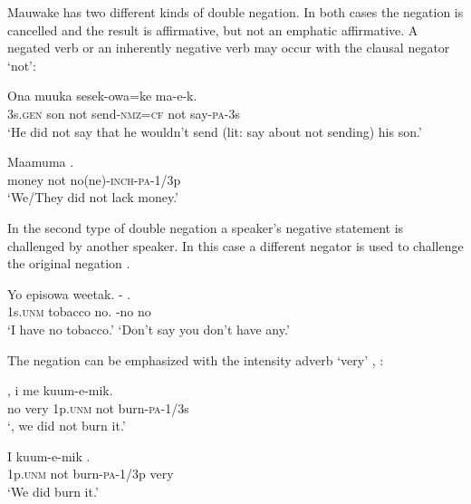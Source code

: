 Mauwake has two different kinds of double negation. In both cases the negation is cancelled and the result is affirmative, but not an emphatic affirmative. A negated verb  or an inherently negative verb  may occur with the clausal negator  `not':

\ea%
\label{ex:6:x1131}
\gll Ona  muuka    sesek-owa=ke    ma-e-k. \\
3s.\textsc{gen}  son  not  send-\textsc{nmz}=\textsc{cf}  not  say-\textsc{pa}-3s\\
\glt `He did not say that he wouldn't send (lit: say about not sending) his son.'
\z

\ea%
\label{ex:6:x1132}
\gll Maamuma    . \\
money  not  no(ne)-\textsc{inch}-\textsc{pa}-1/3p\\
\glt `We/They did not lack money.'
\z

In the second type of double negation a speaker's negative statement is challenged by another speaker. In this case a different negator is used to challenge the original negation . 

\ea%
\label{ex:6:x1133}
\gll Yo  episowa  weetak.  -  . \\
1s.\textsc{unm}  tobacco  no.  -no  no\\
\glt `I have no tobacco.'  `Don't say you don't have any.'
\z

The negation can be emphasized with the intensity adverb  `very' , :

\ea%
\label{ex:6:x1134}
\gll {}  ,  i  me  kuum-e-mik. \\
no  very  1p.\textsc{unm}  not  burn-\textsc{pa}-1/3s\\
\glt `, we did not burn it.'
\z

\ea%
\label{ex:6:x1135}
\gll I    kuum-e-mik  . \\
1p.\textsc{unm}  not  burn-\textsc{pa}-1/3p  very\\
\glt `We did  burn it.'
\z

